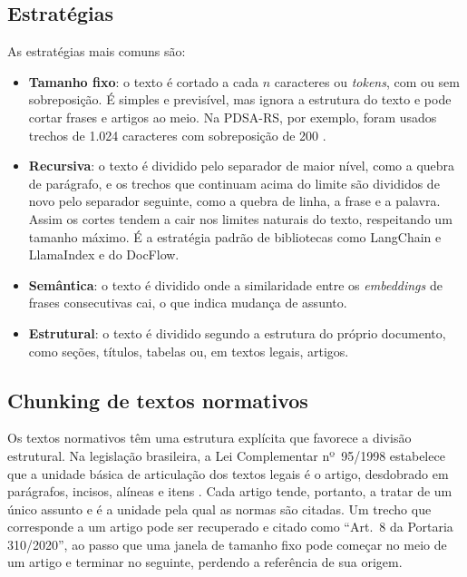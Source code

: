 \subsection{Estratégias}

As estratégias mais comuns são:

\begin{itemize}
	\item \textbf{Tamanho fixo}: o texto é cortado a cada $n$ caracteres ou \textit{tokens}, com ou sem sobreposição. É simples e previsível, mas ignora a estrutura do texto e pode cortar frases e artigos ao meio. Na PDSA-RS, por exemplo, foram usados trechos de 1.024 caracteres com sobreposição de 200 \cite{Montero2025}.
	\item \textbf{Recursiva}: o texto é dividido pelo separador de maior nível, como a quebra de parágrafo, e os trechos que continuam acima do limite são divididos de novo pelo separador seguinte, como a quebra de linha, a frase e a palavra. Assim os cortes tendem a cair nos limites naturais do texto, respeitando um tamanho máximo. É a estratégia padrão de bibliotecas como LangChain e LlamaIndex e do DocFlow.
	\item \textbf{Semântica}: o texto é dividido onde a similaridade entre os \textit{embeddings} de frases consecutivas cai, o que indica mudança de assunto.
	\item \textbf{Estrutural}: o texto é dividido segundo a estrutura do próprio documento, como seções, títulos, tabelas ou, em textos legais, artigos.
\end{itemize}

\subsection{Chunking de textos normativos}

Os textos normativos têm uma estrutura explícita que favorece a divisão estrutural. Na legislação brasileira, a Lei Complementar nº~95/1998 estabelece que a unidade básica de articulação dos textos legais é o artigo, desdobrado em parágrafos, incisos, alíneas e itens \cite{Brasil1998}. Cada artigo tende, portanto, a tratar de um único assunto e é a unidade pela qual as normas são citadas. Um trecho que corresponde a um artigo pode ser recuperado e citado como ``Art.~8 da Portaria 310/2020'', ao passo que uma janela de tamanho fixo pode começar no meio de um artigo e terminar no seguinte, perdendo a referência de sua origem.

